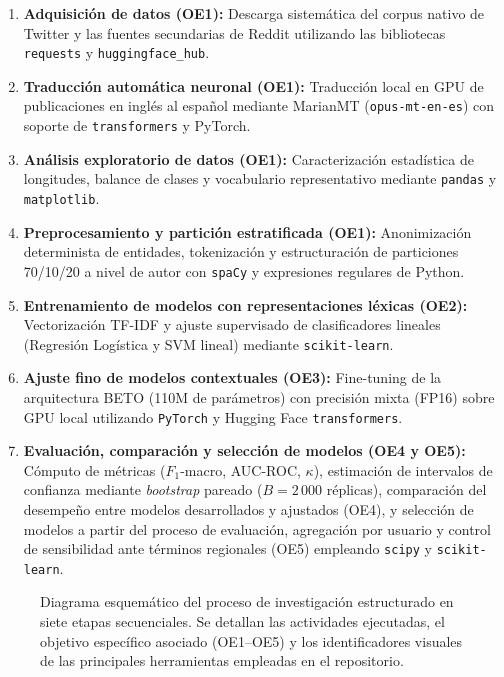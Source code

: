 \documentclass[12pt,a4paper]{article}
\begin{document}
\begin{enumerate}[leftmargin=2em]
    \item \textbf{Adquisición de datos (OE1):} Descarga sistemática del corpus nativo de Twitter y las fuentes secundarias de Reddit utilizando las bibliotecas \texttt{requests} y \texttt{huggingface\_hub}.
    \item \textbf{Traducción automática neuronal (OE1):} Traducción local en GPU de publicaciones en inglés al español mediante MarianMT (\texttt{opus-mt-en-es}) con soporte de \texttt{transformers} y PyTorch.
    \item \textbf{Análisis exploratorio de datos (OE1):} Caracterización estadística de longitudes, balance de clases y vocabulario representativo mediante \texttt{pandas} y \texttt{matplotlib}.
    \item \textbf{Preprocesamiento y partición estratificada (OE1):} Anonimización determinista de entidades, tokenización y estructuración de particiones 70/10/20 a nivel de autor con \texttt{spaCy} y expresiones regulares de Python.
    \item \textbf{Entrenamiento de modelos con representaciones léxicas (OE2):} Vectorización TF-IDF y ajuste supervisado de clasificadores lineales (Regresión Logística y SVM lineal) mediante \texttt{scikit-learn}.
    \item \textbf{Ajuste fino de modelos contextuales (OE3):} Fine-tuning de la arquitectura BETO (110M de parámetros) con precisión mixta (FP16) sobre GPU local utilizando \texttt{PyTorch} y Hugging Face \texttt{transformers}.
    \item \textbf{Evaluación, comparación y selección de modelos (OE4 y OE5):} Cómputo de métricas ($F_1$-macro, AUC-ROC, $\kappa$), estimación de intervalos de confianza mediante \emph{bootstrap} pareado ($B=2\,000$ réplicas), comparación del desempeño entre modelos desarrollados y ajustados (OE4), y selección de modelos a partir del proceso de evaluación, agregación por usuario y control de sensibilidad ante términos regionales (OE5) empleando \texttt{scipy} y \texttt{scikit-learn}.
\end{enumerate}

\begin{figure}[t]
\centering
\resizebox{\textwidth}{!}{}
\caption{Diagrama esquemático del proceso de investigación estructurado en siete etapas secuenciales. Se detallan las actividades ejecutadas, el objetivo específico asociado (OE1--OE5) y los identificadores visuales de las principales herramientas empleadas en el repositorio.}
\label{fig:proceso}
\end{figure}
\end{document}
